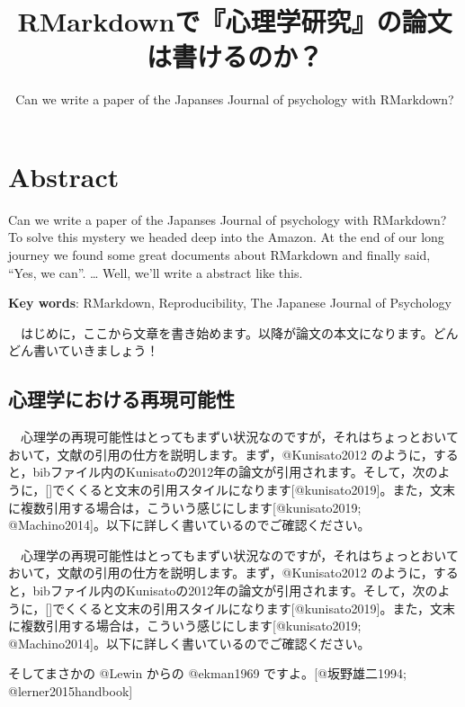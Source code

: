 \documentclass[11pt,a4paper,xelatex,ja=standard]{bxjsarticle}
\title{RMarkdownで『心理学研究』の論文は書けるのか？}
\subtitle{Can we write a paper of the Japanses Journal of psychology with
RMarkdown?}
\author{}
\date{}
\begin{document}
\pagestyle{empty}
\maketitle
\pagestyle{plain}
\setcounter{page}{1}

\hypertarget{abstract}{%
\section{Abstract}\label{abstract}}

Can we write a paper of the Japanses Journal of psychology with
RMarkdown? To solve this mystery we headed deep into the Amazon. At the
end of our long journey we found some great documents about RMarkdown
and finally said, ``Yes, we can''. \ldots{} Well, we'll write a abstract
like this.

\textbf{Key words}: RMarkdown, Reproducibility, The Japanese Journal of
Psychology

\clearpage

　はじめに，ここから文章を書き始めます。以降が論文の本文になります。どんどん書いていきましょう！

\hypertarget{ux5fc3ux7406ux5b66ux306bux304aux3051ux308bux518dux73feux53efux80fdux6027}{%
\subsection{心理学における再現可能性}\label{ux5fc3ux7406ux5b66ux306bux304aux3051ux308bux518dux73feux53efux80fdux6027}}

　心理学の再現可能性はとってもまずい状況なのですが，それはちょっとおいておいて，文献の引用の仕方を説明します。まず，@Kunisato2012
のように，すると，bibファイル内のKunisatoの2012年の論文が引用されます。そして，次のように，{[}{]}でくくると文末の引用スタイルになります{[}@kunisato2019{]}。また，文末に複数引用する場合は，こういう感じにします{[}@kunisato2019;
@Machino2014{]}。以下に詳しく書いているのでご確認ください。

　心理学の再現可能性はとってもまずい状況なのですが，それはちょっとおいておいて，文献の引用の仕方を説明します。まず，@Kunisato2012
のように，すると，bibファイル内のKunisatoの2012年の論文が引用されます。そして，次のように，{[}{]}でくくると文末の引用スタイルになります{[}@kunisato2019{]}。また，文末に複数引用する場合は，こういう感じにします{[}@kunisato2019;
@Machino2014{]}。以下に詳しく書いているのでご確認ください。 　

そしてまさかの @Lewin からの @ekman1969 ですよ。{[}@坂野雄二1994;
@lerner2015handbook{]}

% 


\end{document}
